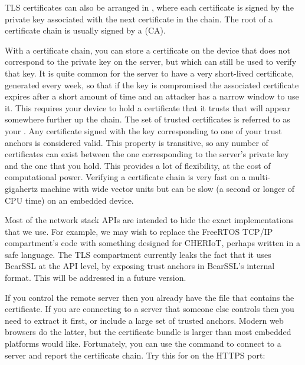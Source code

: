 TLS certificates can also be arranged in , where each certificate is signed by the private key associated with the next certificate in the chain.
The root of a certificate chain is usually signed by a  (CA).

With a certificate chain, you can store a certificate on the device that does not correspond to the private key on the server, but which can still be used to verify that key.
It is quite common for the server to have a very short-lived certificate, generated every week, so that if the key is compromised the associated certificate expires after a short amount of time and an attacker has a narrow window to use it.
This requires your device to hold a certificate that it trusts that will appear somewhere further up the chain.
The set of trusted certificates is referred to as your .
Any certificate signed with the key corresponding to one of your trust anchors is considered valid.
This property is transitive, so any number of certificates can exist between the one corresponding to the server's private key and the one that you hold.
This provides a lot of flexibility, at the cost of computational power.
Verifying a certificate chain is very fast on a multi-gigahertz machine with wide vector units but can be slow (a second or longer of CPU time) on an embedded device.

\begin{note}
Most of the network stack APIs are intended to hide the exact implementations that we use.
For example, we may wish to replace the FreeRTOS TCP/IP compartment's code with something designed for CHERIoT, perhaps written in a safe language.
The TLS compartment currently leaks the fact that it uses BearSSL at the API level, by exposing trust anchors in BearSSL's internal format.
This will be addressed in a future version.
\end{note}

If you control the remote server then you already have the  file that contains the certificate.
If you are connecting to a server that someone else controls then you need to extract it first, or include a large set of trusted anchors.
Modern web browsers do the latter, but the certificate bundle is larger than most embedded platforms would like.
Fortunately, you can use the  command to connect to a server and report the certificate chain.
Try this for  on the HTTPS port:


